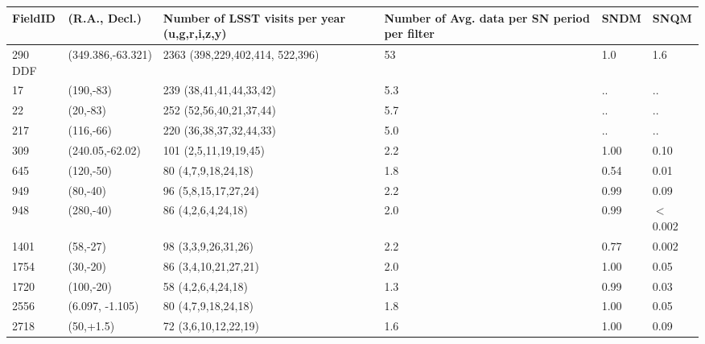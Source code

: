 \begin{center}
\begin{table}
\centering
\begin{tabular}{|p{1.3cm} |p{3.3cm}|p{4cm}|p{1.9cm}|p{1.7cm}|p{1.7cm}|}
\hline
 FieldID & (R.A., Decl.) & Number of LSST visits per year (u,g,r,i,z,y)       & Number of Avg. data
per SN period per filter & SNDM  & SNQM\\
\hline
290 DDF  & (349.386,-63.321)  & 2363 (398,229,402,414, 522,396) & 53 & 1.0  & 1.6 \\
 17      & (190,-83) &    239 (38,41,41,44,33,42) & 5.3 & .. & ..\\
 22      &(20,-83) & 252 (52,56,40,21,37,44)  &5.7 &..&..\\
  217      &(116,-66) &  220 (36,38,37,32,44,33) & 5.0  & .. & ..\\
 309      &(240.05,-62.02) &101 (2,5,11,19,19,45) & 2.2 & 1.00 & 0.10  \\
 645      &(120,-50)  &80 (4,7,9,18,24,18)        & 1.8 &0.54 & 0.01\\
 949      & (80,-40)  &      96 (5,8,15,17,27,24) &  2.2 & 0.99 & 0.09\\
 948      & (280,-40) &      86 (4,2,6,4,24,18)   &  2.0 & 0.99 & $<$0.002\\
 1401      & (58,-27)   & 98 (3,3,9,26,31,26) &   2.2 & 0.77 & 0.002\\
 1754      & (30,-20)  &      86 (3,4,10,21,27,21) &  2.0 & 1.00 & 0.05\\
 1720      & (100,-20) &      58 (4,2,6,4,24,18)   &  1.3 & 0.99 & 0.03 \\
 2556  & (6.097, -1.105) & 80 (4,7,9,18,24,18)  & 1.8 & 1.00 & 0.05\\
 2718     & (50,+1.5) &      72 (3,6,10,12,22,19) &  1.6 & 1.00 & 0.09\\

\end{tabular}
\end{table}
\end{center}
